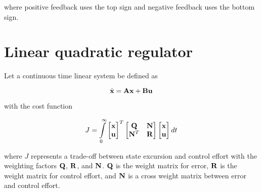 where positive feedback uses the top sign and negative feedback uses the bottom
sign.

\section{Linear quadratic regulator}
\label{sec:deriv_lqr}

Let a continuous time linear \gls{system} be defined as

\begin{equation}
  \dot{\mathbf{x}} = \mathbf{A}\mathbf{x} + \mathbf{B}\mathbf{u}
\end{equation}

with the cost function

\begin{equation*}
  J = \int\limits_0^\infty
    \begin{bmatrix}
      \mathbf{x} \\
      \mathbf{u}
    \end{bmatrix}^T
    \begin{bmatrix}
      \mathbf{Q} & \mathbf{N} \\
      \mathbf{N}^T & \mathbf{R}
    \end{bmatrix}
    \begin{bmatrix}
      \mathbf{x} \\
      \mathbf{u}
    \end{bmatrix} dt
\end{equation*}

where $J$ represents a trade-off between \gls{state} excursion and
\gls{control effort} with the weighting factors $\mathbf{Q}$, $\mathbf{R}$, and
$\mathbf{N}$. $\mathbf{Q}$ is the weight matrix for \gls{error}, $\mathbf{R}$ is the
weight matrix for \gls{control effort}, and $\mathbf{N}$ is a cross weight matrix
between \gls{error} and \gls{control effort}.

